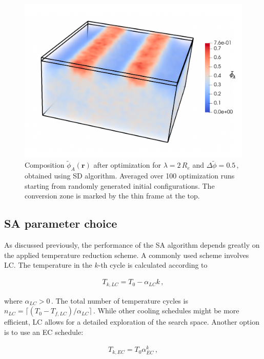 \documentclass[bachelor,       %
               oneside,        %
               BCOR10mm,       %
               ngerman, english %
               ]{GAUBM}
\begin{document}
\begin{figure}[h]
    \centering
    \includegraphics[width=0.5
    \linewidth]{figures/conversion_box.pdf}
    \caption{Composition $\tilde\phi_A(\mathbf r)$ after optimization for $\lambda=2\,R_e$ and $\Delta\tilde\phi=0.5\,,$ obtained using \ac{SD} algorithm. Averaged over 100 optimization runs starting from randomly generated initial configurations. The conversion zone is marked by the thin frame at the top.}
    \label{fig:conversion_box}
\end{figure}

\subsection{SA parameter choice}

As discussed previously, the performance of the \ac{SA} algorithm depends greatly on the applied temperature reduction scheme. A commonly used scheme involves \ac{LC}. The temperature in the $k$-th cycle is calculated according to

\begin{align}
    T_{k,LC}=T_0-\alpha_{LC} k\,,
    \label{eq:lin_cool}
\end{align}

where $\alpha_{LC}>0\,.$ The total number of temperature cycles is $n_{LC}=\lceil(T_0-T_{f,LC})/\alpha_{LC}\rceil\,.$ While other cooling schedules might be more efficient, \ac{LC} allows for a detailed exploration of the search space. Another option is to use an \ac{EC} schedule:

\begin{align}
    T_{k,EC}=T_0\alpha_{EC}^k\,,
    \label{eq:exp_cool}
\end{align}
\end{document}
